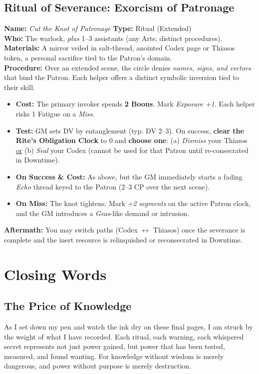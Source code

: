 \documentclass[12pt,twoside]{book}
\begin{document}
\section{Ritual of Severance: Exorcism of Patronage}
\label{subsec:exorcism}
\textbf{Name:} \emph{Cut the Knot of Patronage} \quad \textbf{Type:} Ritual (Extended) \\
\textbf{Who:} The warlock, \emph{plus} 1--3 assistants (any Arts; distinct procedures). \\
\textbf{Materials:} A mirror veiled in salt-thread, anointed Codex page or Thiasos token, a personal sacrifice tied to the Patron’s domain. \\
\textbf{Procedure:} Over an extended scene, the circle denies \emph{names, signs, and vectors} that bind the Patron. Each helper offers a distinct symbolic inversion tied to their skill.
\begin{itemize}
  \item \textbf{Cost:} The primary invoker spends \textbf{2 Boons}. Mark \emph{Exposure +1}. Each helper risks 1 Fatigue on a \emph{Miss}.
  \item \textbf{Test:} GM sets DV by entanglement (typ. DV 2–3). On success, \textbf{clear the Rite’s Obligation Clock} to 0 and \textbf{choose one}: (a) \emph{Dismiss} your Thiasos \underline{or} (b) \emph{Seal} your Codex (cannot be used for that Patron until re-consecrated in Downtime).
  \item \textbf{On Success \& Cost:} As above, but the GM immediately starts a fading \emph{Echo} thread keyed to the Patron (2–3 CP over the next scene).
  \item \textbf{On Miss:} The knot tightens. Mark \emph{+2 segments} on the active Patron clock, and the GM introduces a \emph{Geas}-like demand or intrusion.
\end{itemize}
\textbf{Aftermath:} You may switch paths (Codex $\leftrightarrow$ Thiasos) once the severance is complete and the inert resource is relinquished or reconsecrated in Downtime.

\chapter{Closing Words}

\section*{The Price of Knowledge}

\lettrine[lines=3]{A}{}s I set down my pen and watch the ink dry on these final pages, I am struck by the weight of what I have recorded. Each ritual, each warning, each whispered secret represents not just power gained, but power that has been tested, measured, and found wanting. For knowledge without wisdom is merely dangerous, and power without purpose is merely destruction.
\end{document}
